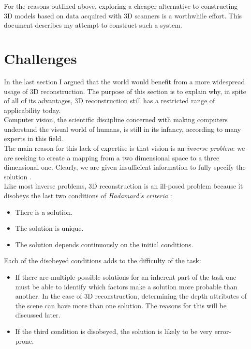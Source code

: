 \documentclass[12pt,a4paper,twoside,openright]{report}
\begin{document}
For the reasons outlined above, exploring a cheaper alternative to constructing 3D models based on data acquired with 3D scanners is a worthwhile effort. This document describes my attempt to construct such a system. 

\section{Challenges}
In the last section I argued that the world would benefit from a more widespread usage of 3D reconstruction. The purpose of this section is to explain why, in spite of all of its advantages, 3D reconstruction still has a restricted range of applicability today. \\
\linebreak
Computer vision, the scientific discipline concerned with making computers understand the visual world of humans, is still in its infancy, according to many experts in this field. \\
The main reason for this lack of expertise is that vision is an \textit{inverse problem}: we are seeking to create a mapping from a two dimensional space to a three dimensional one. Clearly, we are given insufficient information to fully specify the solution \cite[p.~3]{Szeliski+2011}.\\
\linebreak
Like most inverse problems, 3D reconstruction is an ill-posed problem because it disobeys the last two conditions of \textit{Hadamard's criteria} \cite[p.~35]{+2008}:
\begin{itemize}
\item There is a solution.
\item The solution is unique.
\item The solution depends continuously on the initial conditions.
\end{itemize}
Each of the disobeyed conditions adds to the difficulty of the task:\\
\begin{itemize}
\item If there are multiple possible solutions for an inherent part of the task one must be able to identify which factors make a solution more probable than another. In the case of 3D reconstruction, determining the depth attributes of the scene can have more than one solution. The reasons for this will be discussed later.
\item If the third condition is disobeyed, the solution is likely to be very error-prone.
\end{itemize}
\end{document}
